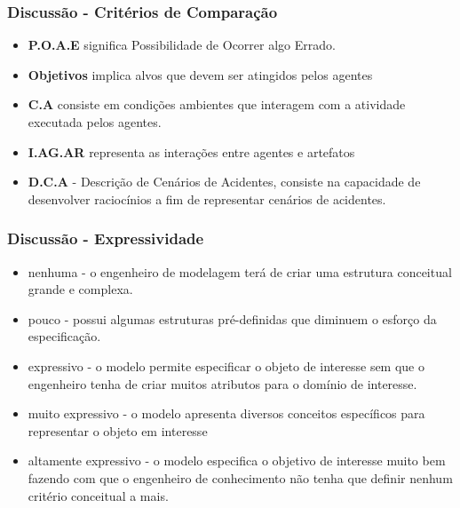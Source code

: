 \documentclass{beamer}
\begin{document}
\begin{frame}
	\frametitle{Discussão - Critérios de Comparação}
	\begin{itemize}
		\item \textbf{P.O.A.E} significa Possibilidade de Ocorrer algo Errado.
		\item \textbf{Objetivos} implica alvos que devem ser atingidos pelos agentes 
		\item \textbf{C.A} consiste em condições ambientes que interagem com a atividade executada pelos agentes.
		\item \textbf{I.AG.AR} representa as interações entre agentes e artefatos
		\item \textbf{D.C.A} - Descrição de Cenários de Acidentes, consiste na capacidade de desenvolver raciocínios a fim de representar cenários de acidentes.
	\end{itemize}
\end{frame}
\begin{frame}
	\frametitle{Discussão - Expressividade}
	\begin{itemize}
			\item nenhuma - o engenheiro de modelagem terá de criar uma estrutura conceitual grande e complexa. 
			\item pouco - possui algumas estruturas pré-definidas que diminuem o esforço da especificação. 
			\item expressivo - o modelo permite especificar o objeto de interesse sem que o engenheiro tenha de criar muitos atributos para o domínio de interesse.
			\item muito expressivo - o modelo apresenta diversos conceitos específicos para representar o objeto em interesse
			\item altamente expressivo - o modelo especifica o objetivo de interesse muito bem fazendo com que o engenheiro de conhecimento não tenha que definir nenhum critério conceitual a mais.
	\end{itemize}
\end{frame}
\end{document}

